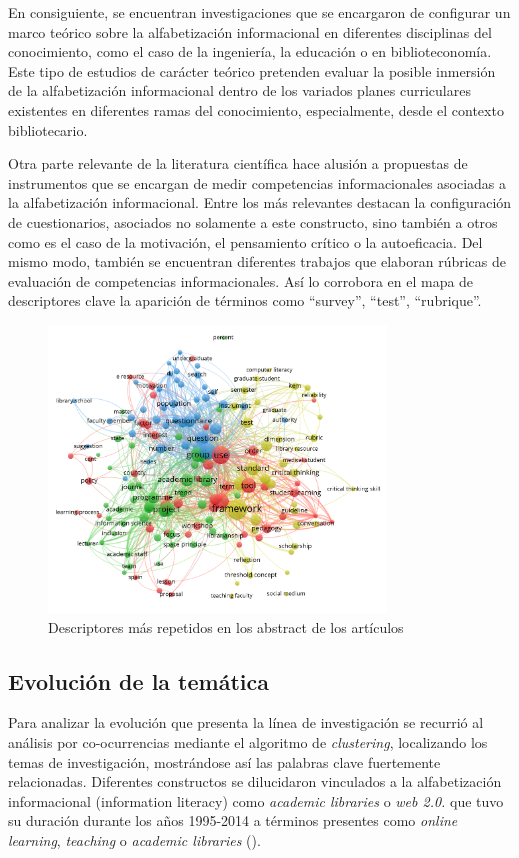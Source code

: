 \documentclass{textolivre}
\begin{document}
En consiguiente, se encuentran investigaciones que se encargaron de configurar un marco teórico sobre la alfabetización informacional en diferentes disciplinas del conocimiento, como el caso de la ingeniería, la educación o en biblioteconomía. Este tipo de estudios de carácter teórico pretenden evaluar la posible inmersión de la alfabetización informacional dentro de los variados planes curriculares existentes en diferentes ramas del conocimiento, especialmente, desde el contexto bibliotecario.

Otra parte relevante de la literatura científica hace alusión a propuestas de instrumentos que se encargan de medir competencias informacionales asociadas a la alfabetización informacional. Entre los más relevantes destacan la configuración de cuestionarios, asociados no solamente a este constructo, sino también a otros como es el caso de la motivación, el pensamiento crítico o la autoeficacia. Del mismo modo, también se encuentran diferentes trabajos que elaboran rúbricas de evaluación de competencias informacionales. Así lo corrobora en el mapa de descriptores clave la aparición de términos como “survey”, “test”, “rubrique”.

\begin{figure}[h!]
 \centering
 \includegraphics[width=0.8\textwidth]{fig3.png}
 \caption{Descriptores más repetidos en los abstract de los artículos}
 \label{fig3}
\end{figure}

\subsection{Evolución de la temática}
Para analizar la evolución que presenta la línea de investigación se recurrió al análisis por co-ocurrencias mediante el algoritmo de \emph{clustering}, localizando los temas de investigación, mostrándose así las palabras clave fuertemente relacionadas. Diferentes constructos se dilucidaron vinculados a la alfabetización informacional (information literacy) como \emph{academic libraries} o \emph{web 2.0.} que tuvo su duración durante los años 1995-2014 a términos presentes como \emph{online learning}, \emph{teaching} o \emph{academic libraries} ().
\end{document}
